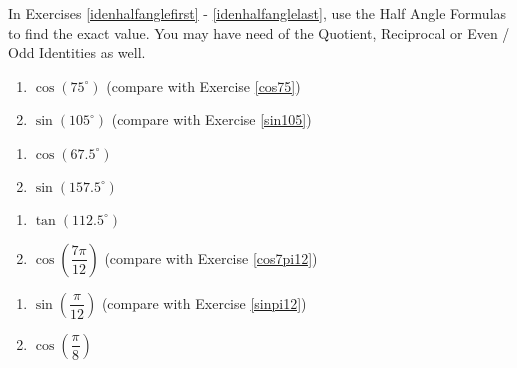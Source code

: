 In Exercises \ref{idenhalfanglefirst} - \ref{idenhalfanglelast}, use the Half Angle Formulas to find the exact value.  You may have need of the Quotient, Reciprocal or Even / Odd Identities as well.

\begin{multicols}{2}

\begin{enumerate}

\setcounter{enumi}{\value{HW}}

\item  $\cos(75^{\circ})$  (compare with Exercise \ref{cos75}) \label{idenhalfanglefirst}
\item  $\sin(105^{\circ})$  (compare with Exercise \ref{sin105})

\setcounter{HW}{\value{enumi}}

\end{enumerate}

\end{multicols}

\begin{multicols}{2}

\begin{enumerate}

\setcounter{enumi}{\value{HW}}

\item  $\cos(67.5^{\circ})$
\item  $\sin(157.5^{\circ})$

\setcounter{HW}{\value{enumi}}

\end{enumerate}

\end{multicols}

\begin{multicols}{2}

\begin{enumerate}

\setcounter{enumi}{\value{HW}}

\item  $\tan(112.5^{\circ})$ 
\item  $\cos\left( \dfrac{7\pi}{12} \right)$  (compare with Exercise \ref{cos7pi12})

\setcounter{HW}{\value{enumi}}

\end{enumerate}

\end{multicols}

\begin{multicols}{2}

\begin{enumerate}

\setcounter{enumi}{\value{HW}}

\item  $\sin\left( \dfrac{\pi}{12} \right)$  (compare with Exercise \ref{sinpi12})
\item $\cos \left( \dfrac{\pi}{8} \right)$

\setcounter{HW}{\value{enumi}}

\end{enumerate}

\end{multicols}

